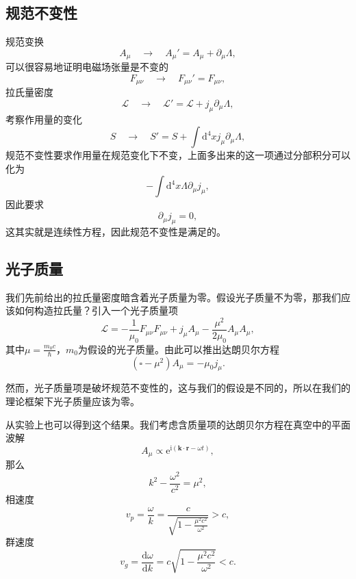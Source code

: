 \documentclass[UTF8]{ctexbook}
\newcommand{\e}{\mathrm{e}}
\renewcommand{\d}{\mathrm{d}}
\renewcommand{\b}{\boldsymbol}
\renewcommand{\i}{\mathrm{i}}
\numberwithin{equation}{chapter}
\begin{document}
	\subsection{规范不变性}
	规范变换
	\[A_\mu\quad\rightarrow \quad A_\mu'=A_\mu+\partial_\mu \Lambda,\]
	可以很容易地证明电磁场张量是不变的
	\[F_{\mu\nu}\quad \rightarrow \quad F_{\mu\nu}'=F_{\mu\nu},\]
	拉氏量密度
	\[\mathcal{L}\quad \rightarrow \quad \mathcal{L}'= \mathcal{L}+ j_\mu\partial_\mu \Lambda,\]
	考察作用量的变化
	\[S\quad \rightarrow \quad S'=S+\int \d^4x j_\mu \partial_\mu \Lambda,\]
	规范不变性要求作用量在规范变化下不变，上面多出来的这一项通过分部积分可以化为
	\[-\int \d^4 x\Lambda \partial_\mu j_\mu,\]
	因此要求
	\[\partial_\mu j_\mu=0,\]
	这其实就是连续性方程，因此规范不变性是满足的。
	
	\subsection{光子质量}
	我们先前给出的拉氏量密度暗含着光子质量为零。假设光子质量不为零，那我们应该如何构造拉氏量？引入一个光子质量项
	\[\mathcal{L}=-\frac{1}{\mu_0}F_{\mu\nu}F_{\mu\nu}+j_\mu A_\mu-\frac{\mu^2}{2\mu_0}A_\mu A_\mu,\]
	其中$\mu=\frac{m_0 c}{\hbar}$，$m_0$为假设的光子质量。由此可以推出达朗贝尔方程
	\[(\square-\mu^2)A_\mu=-\mu_0j_\mu.\]
	
	然而，光子质量项是破坏规范不变性的，这与我们的假设是不同的，所以在我们的理论框架下光子质量应该为零。
	
	从实验上也可以得到这个结果。我们考虑含质量项的达朗贝尔方程在真空中的平面波解
	\[A_\mu \propto \e^{\i(\b{k}\cdot\b{r}-\omega t)},\]
	那么
	\[k^2-\frac{\omega^2}{c^2}=\mu^2,\]
	相速度
	\[v_p=\frac{\omega}{k}=\frac{c}{\sqrt{1-\frac{\mu^2 c^2}{\omega^2}}} > c,\]
	群速度
	\[v_g=\frac{\d \omega}{\d k}= c\sqrt{1-\frac{\mu^2 c^2}{\omega^2}}< c.\]
	
\end{document}
